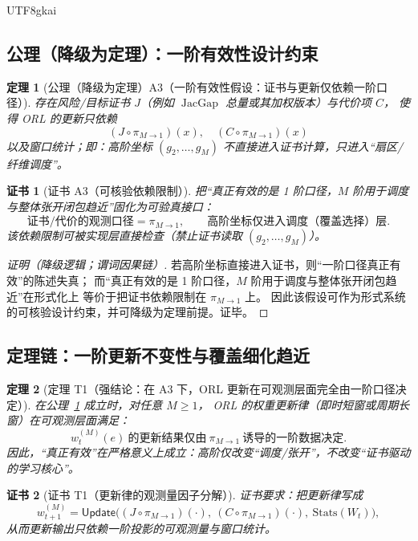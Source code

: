 \documentclass[12pt]{article}
\newtheorem{theorem}{定理}[section]
\newtheorem{Certificate}{证书}[section]
\newcommand{\JacGap}{\operatorname{JacGap}}
\begin{document}
\begin{CJK*}{UTF8}{gkai}
\subsection{公理（降级为定理）：一阶有效性设计约束}
\label{subsec:tex27-ch3-axiom}

\begin{theorem}[公理（降级为定理）A3（一阶有效性假设：证书与更新仅依赖一阶口径）]
\label{thm:tex27-ch3-a3}
存在风险/目标证书 $J$（例如 $\JacGap$ 总量或其加权版本）与代价项 $C$，
使得 ORL 的更新只依赖
\[
  (J\circ \pi_{M\to 1})(x),\quad (C\circ \pi_{M\to 1})(x)
\]
以及窗口统计；即：高阶坐标 $(g_2,\dots,g_M)$ 不直接进入证书计算，只进入“扇区/纤维调度”。
\end{theorem}

\begin{Certificate}[证书 A3（可核验依赖限制）]
\label{cert:tex27-ch3-a3}
把“真正有效的是 1 阶口径，$M$ 阶用于调度与整体张开闭包趋近”固化为可验真接口：
\[
  \text{证书/代价的观测口径}=\pi_{M\to 1},
  \qquad
  \text{高阶坐标仅进入调度（覆盖选择）层}.
\]
该依赖限制可被实现层直接检查（禁止证书读取 $(g_2,\dots,g_M)$）。
\end{Certificate}

\begin{proof}[证明（降级逻辑；谓词因果链）]
若高阶坐标直接进入证书，则“一阶口径真正有效”的陈述失真；
而“真正有效的是 1 阶口径，$M$ 阶用于调度与整体张开闭包趋近”在形式化上
等价于把证书依赖限制在 $\pi_{M\to 1}$ 上。
因此该假设可作为形式系统的可核验设计约束，并可降级为定理前提。证毕。
\end{proof}

\subsection{定理链：一阶更新不变性与覆盖细化趋近}
\label{subsec:tex27-ch3-theorems}

\begin{theorem}[定理 T1（强结论：在 A3 下，ORL 更新在可观测层面完全由一阶口径决定）]
\label{thm:tex27-ch3-t1}
在公理~\ref{thm:tex27-ch3-a3} 成立时，对任意 $M\ge 1$，
ORL 的权重更新律（即时短窗或周期长窗）在可观测层面满足：
\[
  w_t^{(M)}(e)\ \text{的更新结果仅由}\ \pi_{M\to 1}\ \text{诱导的一阶数据决定}.
\]
因此，“真正有效”在严格意义上成立：高阶仅改变“调度/张开”，不改变“证书驱动的学习核心”。
\end{theorem}

\begin{Certificate}[证书 T1（更新律的观测量因子分解）]
\label{cert:tex27-ch3-t1}
证书要求：把更新律写成
\[
  w_{t+1}^{(M)}=\mathsf{Update}\Big((J\circ\pi_{M\to 1})(\cdot),\ (C\circ\pi_{M\to 1})(\cdot),\ \mathrm{Stats}(W_t)\Big),
\]
从而更新输出只依赖一阶投影的可观测量与窗口统计。
\end{Certificate}


\end{CJK*}
\end{document}
